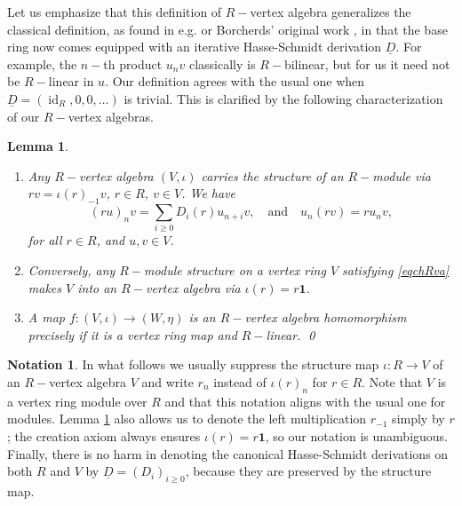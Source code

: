 \documentclass{article}
\newtheorem{lem}[thm]{Lemma}
\theoremstyle{definition}
\newtheorem*{notat}{Notation}
\def\id{\ensuremath{\operatorname{id}}}
\begin{document}
 Let us emphasize that this definition of $R-$vertex algebra generalizes the classical definition, as found in e.g.\@ \cite[Sec.\@ 6.2]{Mason} or Borcherds' original work \cite{Bor}, in that the base ring now comes equipped with an iterative Hasse-Schmidt derivation $\underline D$.
For example, the $n-$th product $u_n v$ classically is $R-$bilinear, but for us it need not be $R-$linear in $u$.
Our definition agrees with the usual one when $\underline D = (\id_R, 0, 0, \dots)$ is trivial.
This is clarified by the following characterization of our $R-$vertex algebras.
 
\begin{lem}\ \label{charRva} 
    \begin{enumerate}[label = \textup{\alph*)}]
        \item \label{charRvaa} Any $R-$vertex algebra $(V,\iota)$ carries the structure of an $R-$module via $rv = \iota(r)_{-1} v$, $r \in R$, $v \in V$.
    We have
    \begin{equation} \label{eqchRva} (ru)_n v = \sum_{i \geq 0} D_i(r) u_{n+i} v, \quad \text{and} \quad u_n(rv) = r u_n v, \end{equation}
    for all $r \in R$, and $u,v \in V$.

        \item \label{charRvab} Conversely, any $R-$module structure on a vertex ring $V$ satisfying \eqref{eqchRva} makes $V$ into an $R-$vertex algebra via $\iota(r) = r\mathbf 1$.
        \item \label{charRvac} A map $f \colon (V, \iota) \to (W, \eta)$ is an $R-$vertex algebra homomorphism precisely if it is a vertex ring map and $R-$linear. \qed
    \end{enumerate}
\end{lem}



\begin{notat}
In what follows we usually suppress the structure map $\iota \colon R \to V$ of an $R-$vertex algebra $V$ and write $r_n$ instead of $\iota(r)_n$ for $r \in R$.
Note that $V$ is a vertex ring module over $R$ and that this notation aligns with the usual one for modules.
	Lemma \ref{charRva} also allows us to denote the left multiplication $r_{-1}$ simply by $r$; the creation axiom always ensures $\iota(r) = r \mathbf 1$, so our notation is unambiguous. Finally, there is no harm in denoting the canonical Hasse-Schmidt derivations on both $R$ and $V$ by $\underline D = (D_i)_{i\geq 0}$, because they are preserved by the structure map.
\end{notat}
\end{document}
